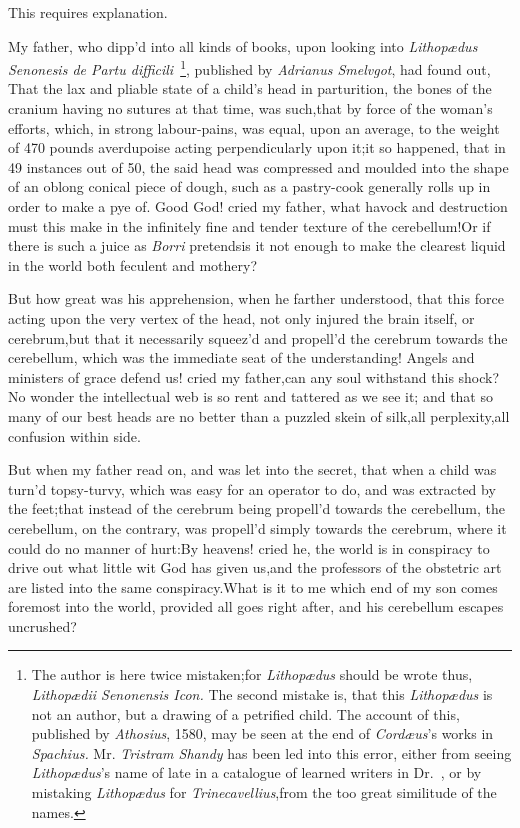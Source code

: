 \documentclass{article}
\begin{document}
\tsh This requires explanation.

My father, who dipp’d into all kinds of books, upon looking into \textit{Lithopædus
Senonesis de Partu difficili}\ \footnote{\fontsize{8}{11}\selectfont\quad 
The author is here twice mistaken;\tsh for \textit{Lithopædus} should be wrote thus,
\textit{Lithopædii Seno\-nensis Icon.} The second mistake is, that this
\textit{Li\-thopædus} is not an author, but a drawing of a petrified child. The
account of this, published by \textit{Athosius}, 1580, may be seen at the end of
\textit{Cordæus}’s works in \textit{Spachius.} Mr.  \textit{Tristram Shandy} has
been led into this error, either from seeing \textit{Lithopædus}’s name of late in a
catalogue of learned writers in \hbox{Dr. \tsh}, or by mistaking \textit{Lithopædus}
for \textit{Trinecavellius},\tsk from the too great similitude of the names.},
published by\pb
\textit{Adrianus Smelvgot}, had found out, That\break
the lax and pliable state of a child’s\break
head in parturition, the bones of the\break
cranium having no sutures at that time,\break
was such,\tsk that by force of the woman’s\break
efforts, which, in strong labour-pains,\break
was equal, upon an average, to the
weight of 470 pounds averdupoise acting perpendicularly upon it;\tsk it so happened,
that in 49 instances out of 50, the said head was compressed and moulded into the
shape of an oblong conical piece of dough, such as a pastry-cook generally rolls up
in order to make a pye of.\tsh\break
Good God!  cried my father, what havock and destruction
must this make in the infinitely fine and tender texture of the cerebellum!\tsk Or if
there is such a juice as \textit{Borri} pretends\tsk is it not enough to make the
clearest liquid in the world both feculent and mothery?

\newpage
But how great was his apprehension, when he farther understood,
that this force acting upon the very vertex of the head, not only
injured the brain itself, or cerebrum,\tsk but that it
necessarily squeez’d and propell’d the cerebrum towards the
cerebellum, which was the immediate seat of the
understanding!\tsh\break
Angels and ministers of grace defend
us! cried my father,\tsk can any soul withstand this
shock?\tsk No wonder the intellectual web is so rent and tattered
as we see it; and that so many of our best heads are no better than
a puzzled skein of silk,\tsk all
perplexity,\tsk all confusion within side.

But when my father read on, and was let into the secret, that
when a child was turn’d topsy-turvy, which was easy for an operator
to do, and was extracted by the feet;\tsk that instead of the
cerebrum being propell’d towards the cerebellum, the cerebellum, on
the contrary, was propell’d simply towards the cerebrum, where it could
do no manner of hurt:\tsh By heavens! cried he, the world
is in conspiracy to drive out what little wit God has given
us,\tsk and the professors of the obstetric art are listed
into the same conspiracy.\tsk What is it to me which end of my
son comes foremost into the world, provided all goes right after,
and his cerebellum escapes uncrushed?
\end{document}
